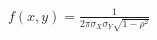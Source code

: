 \documentclass[preview]{standalone}
\begin{document}
\begin{align*}
f(x, y) = \frac{1}{2 \pi \sigma_X \sigma_Y \sqrt{1 - \rho^2}}
\end{align*}
\end{document}

